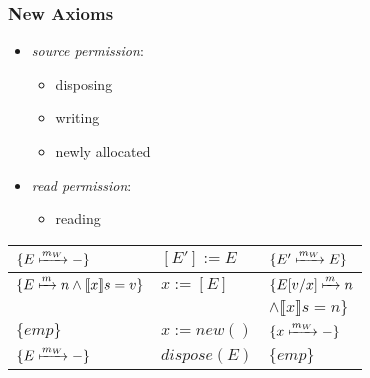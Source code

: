 \documentclass{beamer}
\begin{document}
	\begin{frame}
	\frametitle{New Axioms}
	\begin{minipage}{0.5\textwidth}
		\begin{itemize}
			\item \emph{source permission}:
			\begin{itemize}
				\item disposing
				\item writing
				\item newly allocated
			\end{itemize}
		\end{itemize}
	\end{minipage}\noindent
	\begin{minipage}{0.5\textwidth}
		\begin{itemize}
			\item \emph{read permission}:
			\begin{itemize}
				\item reading
			\end{itemize}
		\end{itemize}
	\end{minipage}
	\begin{center}
	\begin{tabular}{p{4cm}p{3cm}p{2.4cm}}
		$\{E\xmapsto{m_W}-\}$ & $[E'] := E$ & $\{E'\xmapsto{m_W}E\}$ \\
		\hline
		$\{E\xmapsto{m} n \land \llbracket x\rrbracket s =v\}$ & $x:=[E]$ & $\{E[v/x]\xmapsto{m}n$\\
		&&\hspace{0.5cm}$\land\llbracket x\rrbracket s = n\}$\\
		\hline
		$\{\textit{emp}\}$ & $x:=\textit{new}()$ & $\{x \xmapsto{m_W} -\}$\\
		\hline
		$\{E\xmapsto{m_W}-\}$ & $\textit{dispose}(E)$ & $\{\textit{emp}\}$\\
	\end{tabular}
	\end{center}

	\end{frame}
\end{document}
